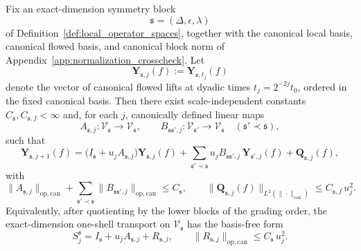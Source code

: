 \begin{theorem}\label{thm:canonical_block_one_shell_increment}
Fix an exact-dimension symmetry block
\[
\mathfrak s=(\Delta,\epsilon,\lambda)
\]
of Definition~\ref{def:local_operator_spaces}, together with the canonical local basis, canonical flowed basis, and canonical block norm of
Appendix~\ref{app:normalization_crosscheck}.
Let
\[
\mathbf Y_{\mathfrak s,j}(f):=\mathbf Y_{\mathfrak s,t_j}(f)
\]
denote the vector of canonical flowed lifts at dyadic times $t_j=2^{-2j}t_0$, ordered in the fixed canonical basis.
Then there exist scale-independent constants $C_{\mathfrak s},C_{\mathfrak s,f}<\infty$ and, for each $j$, canonically defined linear maps
\[
A_{\mathfrak s,j}:\mathscr V_{\mathfrak s}\to \mathscr V_{\mathfrak s},
\qquad
B_{\mathfrak s\mathfrak s',j}:\mathscr V_{\mathfrak s'}\to \mathscr V_{\mathfrak s}
\quad (\mathfrak s'\prec \mathfrak s),
\]
such that
\begin{equation}\label{eq:canonical_block_one_shell}
\mathbf Y_{\mathfrak s,j+1}(f)
=
\bigl(I_{\mathfrak s}+u_jA_{\mathfrak s,j}\bigr)\mathbf Y_{\mathfrak s,j}(f)
+\sum_{\mathfrak s'\prec \mathfrak s}u_j B_{\mathfrak s\mathfrak s',j}\,\mathbf Y_{\mathfrak s',j}(f)
+\mathbf Q_{\mathfrak s,j}(f),
\end{equation}
with
\begin{equation}\label{eq:canonical_block_one_shell_bounds}
\|A_{\mathfrak s,j}\|_{\mathrm{op,can}}+\sum_{\mathfrak s'\prec \mathfrak s}\|B_{\mathfrak s\mathfrak s',j}\|_{\mathrm{op,can}}
\le C_{\mathfrak s},
\qquad
\|\mathbf Q_{\mathfrak s,j}(f)\|_{L^2(\|\cdot\|_{\mathrm{can}})}\le C_{\mathfrak s,f}\,u_j^2.
\end{equation}
Equivalently, after quotienting by the lower blocks of the grading order, the exact-dimension one-shell transport on $\mathscr V_{\mathfrak s}$ has the basis-free form
\[
S_j^{\mathfrak s}=I_{\mathfrak s}+u_jA_{\mathfrak s,j}+R_{\mathfrak s,j},
\qquad
\|R_{\mathfrak s,j}\|_{\mathrm{op,can}}\le C_{\mathfrak s}\,u_j^2.
\]
\end{theorem}

